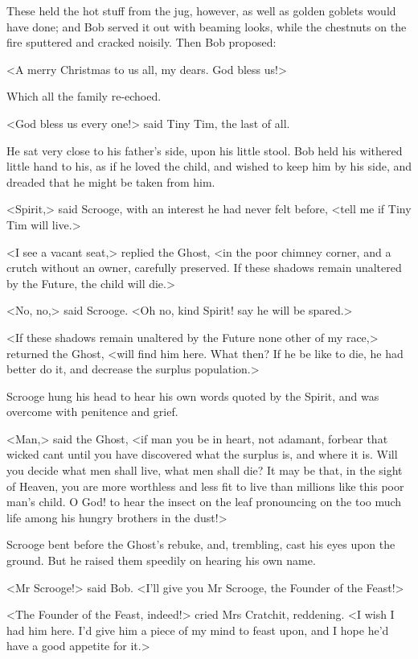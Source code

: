 These held the hot stuff from the jug, however, as well as golden goblets would
have done; and Bob served it out with beaming looks, while the chestnuts on the
fire sputtered and cracked noisily. Then Bob proposed:

<A merry Christmas to us all, my dears. God bless us!>

Which all the family re-echoed.

<God bless us every one!> said Tiny Tim, the last of all.

He sat very close to his father's side, upon his little stool. Bob held his
withered little hand to his, as if he loved the child, and wished to keep him by
his side, and dreaded that he might be taken from him.

<Spirit,> said Scrooge, with an interest he had never felt before, <tell me if
Tiny Tim will live.>

<I see a vacant seat,> replied the Ghost, <in the poor chimney corner, and a
crutch without an owner, carefully preserved. If these shadows remain unaltered
by the Future, the child will die.>

<No, no,> said Scrooge. <Oh no, kind Spirit! say he will be spared.>

<If these shadows remain unaltered by the Future none other of my race,>
returned the Ghost, <will find him here. What then? If he be like to die, he had
better do it, and decrease the surplus population.>

Scrooge hung his head to hear his own words quoted by the Spirit, and was
overcome with penitence and grief.

<Man,> said the Ghost, <if man you be in heart, not adamant, forbear that wicked
cant until you have discovered what the surplus is, and where it is. Will you
decide what men shall live, what men shall die? It may be that, in the sight of
Heaven, you are more worthless and less fit to live than millions like this poor
man's child. O God! to hear the insect on the leaf pronouncing on the too much
life among his hungry brothers in the dust!>

Scrooge bent before the Ghost's rebuke, and, trembling, cast his eyes upon the
ground. But he raised them speedily on hearing his own name.

<Mr Scrooge!> said Bob. <I'll give you Mr Scrooge, the Founder of the Feast!>

<The Founder of the Feast, indeed!> cried Mrs Cratchit, reddening. <I wish I had
him here. I'd give him a piece of my mind to feast upon, and I hope he'd have a
good appetite for it.>


